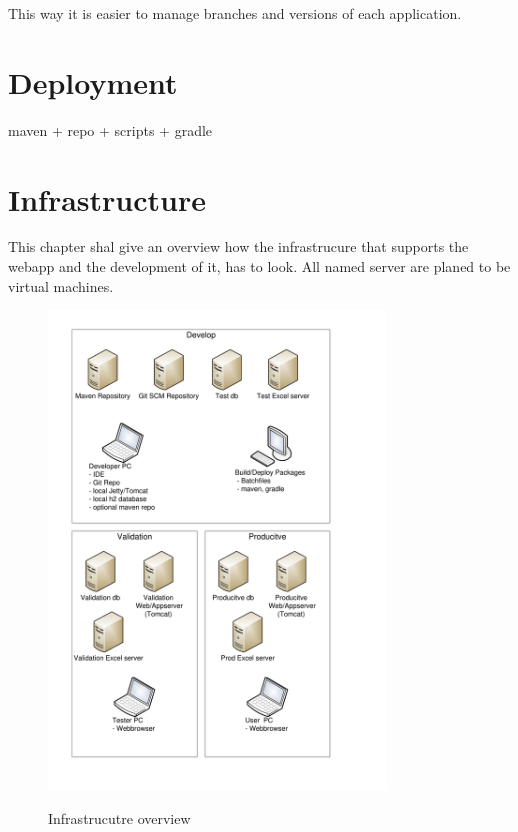 \documentclass[paper=a4,twoside=false,BCOR=0mm,DIV=calc,fontsize=12pt]{scrartcl}
\begin{document}
This way it is easier to manage branches and versions of each application.





\section{Deployment}

maven + repo + scripts + gradle


\section{Infrastructure}
This chapter shal give an overview how the infrastrucure that supports the webapp and the development of it, has to look. 
All named server are planed to be virtual machines.

\begin{figure}
    \begin{center}
       \includegraphics[width=0.8\textwidth]{./img/InfrastructureLayout.pdf}\\
    \end{center}
  \caption{Infrastrucutre overview}
  \label{infrastructureoverview}
\end{figure} 
\end{document}
